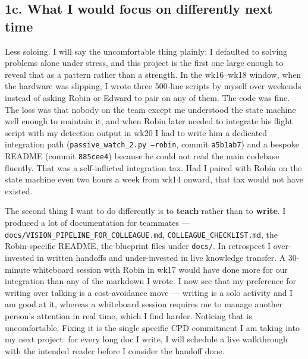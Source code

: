 \subsection*{1c. What I would focus on differently next time}

Less soloing. I will say the uncomfortable thing plainly: I defaulted to solving problems alone under stress, and this project is the first one large enough to reveal that as a pattern rather than a strength. In the wk16--wk18 window, when the hardware was slipping, I wrote three 500-line scripts by myself over weekends instead of asking Robin or Edward to pair on any of them. The code was fine. The loss was that nobody on the team except me understood the state machine well enough to maintain it, and when Robin later needed to integrate his flight script with my detection output in wk20 I had to write him a dedicated integration path (\texttt{passive\_watch\_2.py --robin}, commit \texttt{a5b1ab7}) and a bespoke README (commit \texttt{885cee4}) because he could not read the main codebase fluently. That was a self-inflicted integration tax. Had I paired with Robin on the state machine even two hours a week from wk14 onward, that tax would not have existed.

The second thing I want to do differently is to \textbf{teach} rather than to \textbf{write}. I produced a lot of documentation for teammates --- \texttt{docs/VISION\_PIPELINE\_FOR\_COLLEAGUE.md}, \texttt{COLLEAGUE\_CHECKLIST.md}, the Robin-specific README, the blueprint files under \texttt{docs/}. In retrospect I over-invested in written handoffs and under-invested in live knowledge transfer. A 30-minute whiteboard session with Robin in wk17 would have done more for our integration than any of the markdown I wrote. I now see that my preference for writing over talking is a cost-avoidance move --- writing is a solo activity and I am good at it, whereas a whiteboard session requires me to manage another person's attention in real time, which I find harder. Noticing that is uncomfortable. Fixing it is the single specific CPD commitment I am taking into my next project: for every long doc I write, I will schedule a live walkthrough with the intended reader before I consider the handoff done.
